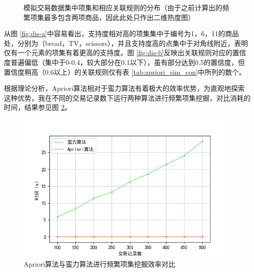 \documentclass[12pt,a4paper]{article}
\theoremstyle{definition}
\begin{document}
\begin{figure}[H]
	\centering
	\caption{模拟交易数据集中项集和相应关联规则的分布（由于之前计算出的频繁项集最多包含两项商品，因此此处只作出二维热度图）}
	\label{fig:dis}
\end{figure}

从图 \ref{fig:dis-a}中容易看出，支持度相对高的项集集中于编号为1，6，11的商品处，分别为（bread，TV，scissors），并且支持度高的点集中于对角线附近，表明仅有一个元素的项集有着更高的支持度。图 \ref{fig:dis-b}反映出关联规则对应的置信度普遍偏低（集中于0-0.4，较大部分在0.1以下），虽有部分达到0.5的置信度，但置信度稍高（0.6以上）的关联规则仅有表 \ref{tab:apriori_sim_con}中所列的数个。

\vspace{0.01\linewidth}
根据理论分析，Apriori算法相对于蛮力算法有着极大的效率优势，为直观地探索这种优势，我在不同的交易记录数下运行两种算法进行频繁项集挖掘，对比消耗的时间，结果参见图 \ref{fig:time_com}。

\begin{figure}[H]
	\centering
	\includegraphics[width=0.7\linewidth]{img/time_kline.png}
	\caption{Apriori算法与蛮力算法进行频繁项集挖掘效率对比}
	\label{fig:time_com}
\end{figure}
\end{document}
